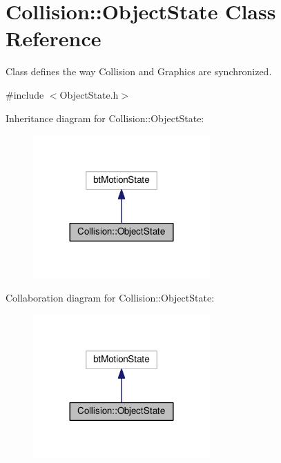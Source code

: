 \hypertarget{class_collision_1_1_object_state}{}\section{Collision\+:\+:Object\+State Class Reference}
\label{class_collision_1_1_object_state}


Class defines the way Collision and Graphics are synchronized.  




{\ttfamily \#include $<$Object\+State.\+h$>$}



Inheritance diagram for Collision\+:\+:Object\+State\+:\nopagebreak
\begin{figure}[H]
\begin{center}
\leavevmode
\includegraphics[width=192pt]{class_collision_1_1_object_state__inherit__graph}
\end{center}
\end{figure}


Collaboration diagram for Collision\+:\+:Object\+State\+:\nopagebreak
\begin{figure}[H]
\begin{center}
\leavevmode
\includegraphics[width=192pt]{class_collision_1_1_object_state__coll__graph}
\end{center}
\end{figure}
